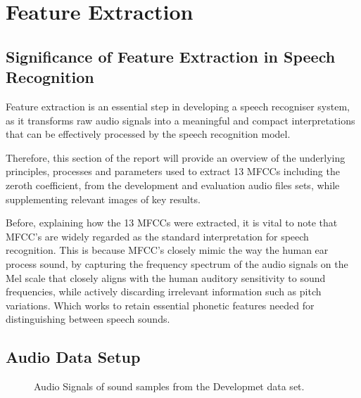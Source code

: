 \documentclass{article}
\begin{document}

\section{Feature Extraction}

\subsection{Significance of Feature Extraction in Speech Recognition}
Feature extraction is an essential step in developing a speech recogniser system, as it transforms raw audio signals into a meaningful and compact interpretations that can be effectively processed by the speech recognition model.

Therefore, this section of the report will provide an overview of the underlying principles, processes and parameters used to extract 13 MFCCs including the zeroth coefficient, from the development and evaluation audio files sets, while supplementing relevant images of key results.

Before, explaining how the 13 MFCCs were extracted, it is vital to note that MFCC’s are widely regarded as the standard interpretation for speech recognition. This is because MFCC’s closely mimic the way the human ear process sound, by capturing the frequency spectrum of the audio signals on the Mel scale that closely aligns with the human auditory sensitivity to sound frequencies, while actively discarding irrelevant information such as pitch variations. Which works to retain essential phonetic features needed for distinguishing between speech sounds. 

\subsection{Audio Data Setup}


\begin{figure}[!tbp]
  \centering
  \hfill
  \hfill
  \hfill
  \caption{\label{fig:audio} Audio Signals of sound samples from the Developmet data set.}
\end{figure}
\end{document}
